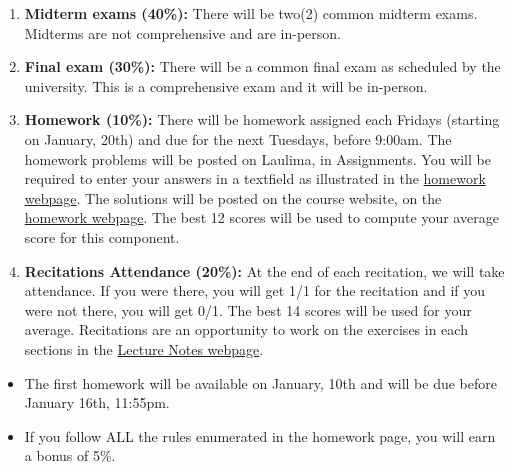 \documentclass[12pt]{amsart}
\begin{document}
\begin{enumerate}
\item {\bf Midterm exams (40\%):} There will be two(2) common midterm exams. Midterms are not comprehensive and are in-person. 
\item {\bf Final exam (30\%):} There will be a common final exam as scheduled by the university. This is a comprehensive exam and it will be in-person.
\item{\bf Homework (10\%):} There will be homework assigned each Fridays (starting on January, 20th) and due for the next Tuesdays, before 9:00am. The homework problems will be posted on Laulima, in Assignments. You will be required to enter your answers in a textfield as illustrated in the \href{https://mathopo.ca/courses-website/math-241/Homework.html}{homework webpage}. The solutions will be posted on the course website, on the \href{https://mathopo.ca/courses-website/math-241/Homework.html}{homework webpage}. The best 12 scores will be used to compute your average score for this component.
\item{\bf Recitations Attendance (20\%):} At the end of each recitation, we will take attendance. If you were there, you will get 1/1 for the recitation and if you were not there, you will get 0/1. The best 14 scores will be used for your average. Recitations are an opportunity to work on the exercises in each sections in the \href{https://mathopo.ca/courses-website/math-241/Lecture-Notes.html}{Lecture Notes webpage}.
\end{enumerate}

	\begin{itemize}
	\item The first homework will be available on January, 10th and will be due before January 16th, 11:55pm.
	\item If you follow ALL the rules enumerated in the homework page, you will earn a bonus of 5\%.
	\end{itemize}

\end{document}
